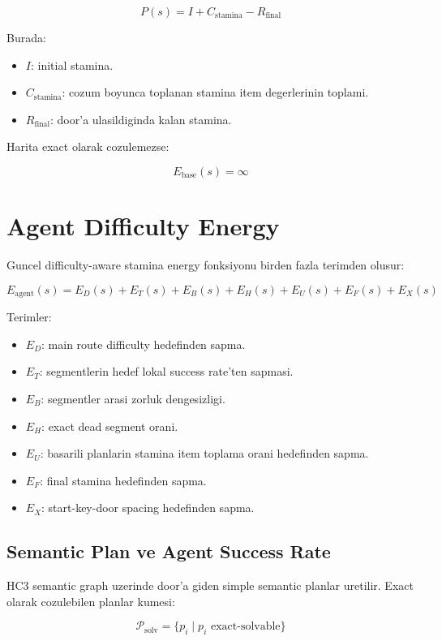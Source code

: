 \documentclass[11pt]{article}
\begin{document}
\[
P(s)
=
I
+
C_{\text{stamina}}
-
R_{\text{final}}
\]

Burada:

\begin{itemize}
  \item $I$: initial stamina.
  \item $C_{\text{stamina}}$: cozum boyunca toplanan stamina item degerlerinin toplami.
  \item $R_{\text{final}}$: door'a ulasildiginda kalan stamina.
\end{itemize}

Harita exact olarak cozulemezse:

\[
E_{\text{base}}(s) = \infty
\]

\section{Agent Difficulty Energy}

Guncel difficulty-aware stamina energy fonksiyonu birden fazla terimden olusur:

\[
E_{\text{agent}}(s)
=
E_D(s)
+
E_T(s)
+
E_B(s)
+
E_H(s)
+
E_U(s)
+
E_F(s)
+
E_X(s)
\]

Terimler:

\begin{itemize}
  \item $E_D$: main route difficulty hedefinden sapma.
  \item $E_T$: segmentlerin hedef lokal success rate'ten sapmasi.
  \item $E_B$: segmentler arasi zorluk dengesizligi.
  \item $E_H$: exact dead segment orani.
  \item $E_U$: basarili planlarin stamina item toplama orani hedefinden sapma.
  \item $E_F$: final stamina hedefinden sapma.
  \item $E_X$: start-key-door spacing hedefinden sapma.
\end{itemize}

\subsection{Semantic Plan ve Agent Success Rate}

HC3 semantic graph uzerinde door'a giden simple semantic planlar uretilir.
Exact olarak cozulebilen planlar kumesi:

\[
\mathcal{P}_{\text{solv}}
=
\{p_i \mid p_i \text{ exact-solvable}\}
\]
\end{document}
